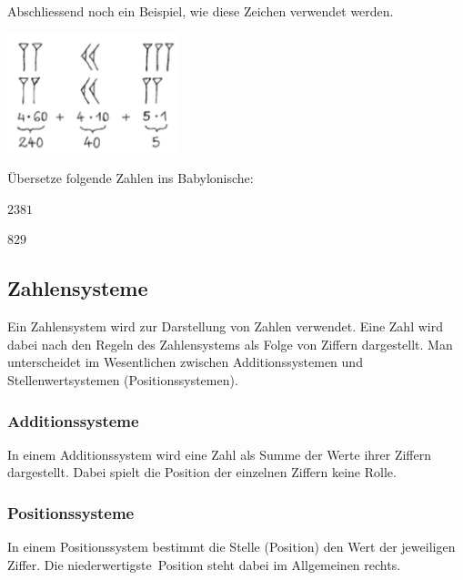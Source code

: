 \documentclass[%
11pt,%
twoside,%
titlepage,%
german,%
headsepline%
]{scrartcl}
\begin{document}
Abschliessend noch ein Beispiel, wie diese Zeichen verwendet werden.
\begin{center}
\includegraphics[width=5cm]{pictures/babylon285}
\end{center}
\begin{ueb}
Übersetze folgende Zahlen ins \glqq Babylonische\grqq:

\begin{minipage}{0.382\textwidth}
\begin{enumeratea}
\item $2381$
\end{enumeratea}
\end{minipage}
\begin{minipage}{0.23\textwidth}
\begin{enumeratea}
\addtocounter{enumi}{1}
\item $829$
\end{enumeratea}
\end{minipage}
\end{ueb}

\subsection{Zahlensysteme}
Ein Zahlensystem wird zur Darstellung von Zahlen verwendet. Eine Zahl wird dabei nach den Regeln des Zahlensystems als Folge von Ziffern dargestellt. Man unterscheidet im Wesentlichen zwischen Additionssystemen und Stellenwertsystemen (Positionssystemen).
\subsubsection{Additionssysteme}
In einem Additionssystem wird eine Zahl als Summe der Werte ihrer Ziffern dargestellt. Dabei spielt die Position der einzelnen Ziffern keine Rolle.

\subsubsection{Positionssysteme}
In einem Positionssystem bestimmt die Stelle (Position) den Wert der jeweiligen Ziffer. Die \glqq niederwertigste\grqq\ Position steht dabei im Allgemeinen rechts.
\end{document}
